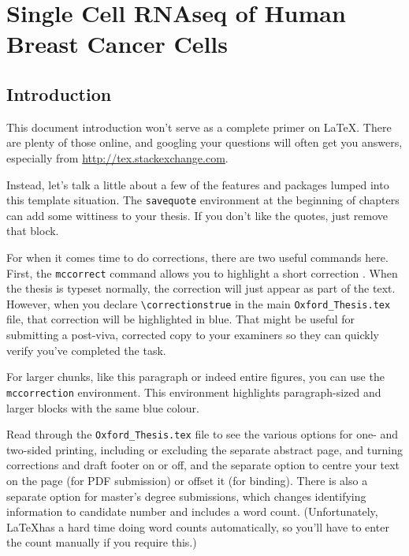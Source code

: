 \chapter{\label{ch:3}Single Cell RNAseq of Human Breast Cancer Cells}

\minitoc

\section{Introduction}

This document introduction won't serve as a complete primer on \LaTeX.  There are plenty of those online, and googling your questions will often get you answers, especially from \url{http://tex.stackexchange.com}.

Instead, let's talk a little about a few of the features and packages lumped into this template situation.  The \verb|savequote| environment at the beginning of chapters can add some wittiness to your thesis.  If you don't like the quotes, just remove that block.

For when it comes time to do corrections, there are two useful commands here.  First, the \verb|mccorrect| command allows you to highlight a short correction .  When the thesis is typeset normally, the correction will just appear as part of the text.  However, when you declare \verb|\correctionstrue| in the main \verb|Oxford_Thesis.tex| file, that correction will be highlighted in blue.  That might be useful for submitting a post-viva, corrected copy to your examiners so they can quickly verify you've completed the task.

\begin{mccorrection}
For larger chunks, like this paragraph or indeed entire figures, you can use the \verb|mccorrection| environment.  This environment highlights paragraph-sized and larger blocks with the same blue colour.
\end{mccorrection}

Read through the \verb|Oxford_Thesis.tex| file to see the various options for one- and two-sided printing, including or excluding the separate abstract page, and turning corrections and draft footer on or off, and the separate option to centre your text on the page (for PDF submission) or offset it (for binding).  There is also a separate option for master's degree submissions, which changes identifying information to candidate number and includes a word count.  (Unfortunately, \LaTeX has a hard time doing word counts automatically, so you'll have to enter the count manually if you require this.)

